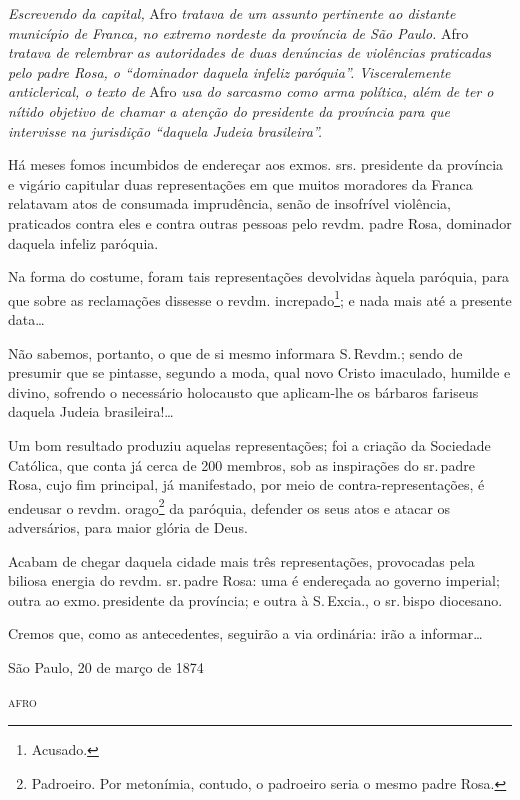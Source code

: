 \begin{didascalia}
\emph{Escrevendo da capital,} Afro \emph{tratava de um assunto
pertinente ao distante município de Franca, no extremo nordeste da
província de São Paulo.} Afro \emph{tratava de relembrar as autoridades
de duas denúncias de violências praticadas pelo padre Rosa, o ``dominador
daquela infeliz paróquia''. Visceralemente anticlerical, o texto de} Afro
\emph{usa do sarcasmo como arma política, além de ter o nítido objetivo
de chamar a atenção do presidente da província para que intervisse na
jurisdição ``daquela Judeia brasileira''.}
\end{didascalia}

Há meses fomos incumbidos de endereçar aos exmos. srs. presidente da
província e vigário capitular duas representações em que muitos
moradores da Franca relatavam atos de consumada imprudência, senão de
insofrível violência, praticados contra eles e contra outras pessoas
pelo revdm. padre Rosa, dominador daquela infeliz paróquia.

Na forma do costume, foram tais representações devolvidas àquela
paróquia, para que sobre as reclamações dissesse o revdm.
increpado\footnote{ Acusado.}; e nada mais até a presente data\ldots{}

Não sabemos, portanto, o que de si mesmo informara S.\,Revdm.; sendo de
presumir que se pintasse, segundo a moda, qual novo Cristo imaculado,
humilde e divino, sofrendo o necessário holocausto que aplicam-lhe os
bárbaros fariseus daquela Judeia brasileira!\ldots{}

Um bom resultado produziu aquelas representações; foi a criação da
Sociedade Católica, que conta já cerca de 200 membros, sob as
inspirações do sr.\,padre Rosa, cujo fim principal, já manifestado, por
meio de contra-representações, é endeusar o revdm. orago\footnote{
  Padroeiro. Por metonímia, contudo, o padroeiro seria o mesmo padre
  Rosa.} da paróquia, defender os seus atos e atacar os adversários,
para maior glória de Deus.

Acabam de chegar daquela cidade mais três representações, provocadas
pela biliosa energia do revdm. sr.\,padre Rosa: uma é endereçada ao
governo imperial; outra ao exmo.\,presidente da província; e outra à S.\,Excia., o sr.\,bispo diocesano.

Cremos que, como as antecedentes, seguirão a via ordinária: irão a
informar\ldots{}

\begin{flushright}
São Paulo, 20 de março de 1874

\textsc{afro}
\end{flushright}


